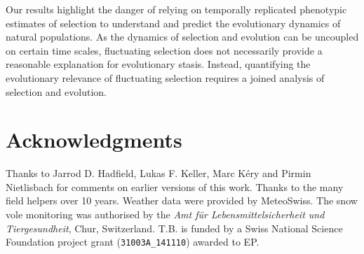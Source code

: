 Our results highlight the danger of relying on temporally replicated phenotypic estimates of selection to understand and predict the evolutionary dynamics of natural populations. As the dynamics of selection and evolution can be uncoupled on certain time scales, fluctuating selection does not necessarily provide a reasonable explanation for evolutionary stasis. Instead, quantifying the evolutionary relevance of fluctuating selection requires a joined analysis of selection and evolution.  

\section*{Acknowledgments}
Thanks to Jarrod D. Hadfield, Lukas F. Keller, Marc K\'{e}ry and Pirmin Nietlisbach for comments on earlier versions of this work. Thanks to the many field helpers over 10 years. Weather data were provided by MeteoSwiss. The snow vole monitoring was authorised by the \textit{Amt f\"{u}r Lebensmittelsicherheit und Tiergesundheit}, Chur, Switzerland. T.B. is funded by a Swiss National Science Foundation project grant (\verb|31003A_141110|) awarded to EP. 

